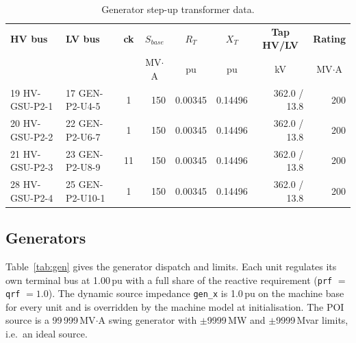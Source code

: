\begin{table}[!ht]
\centering
\small\begin{tabularx}{\linewidth}{@{}l l c r r r r r@{}}
\toprule
\textbf{HV bus} & \textbf{LV bus} & \multicolumn{1}{c}{\textbf{ck}} & \multicolumn{1}{c}{\textbf{$S_{base}$}} & \multicolumn{1}{c}{\textbf{$R_T$}} & \multicolumn{1}{c}{\textbf{$X_T$}} & \multicolumn{1}{c}{\textbf{Tap HV/LV}} & \multicolumn{1}{c}{\textbf{Rating}} \\
 & & & \multicolumn{1}{c}{MV$\cdot$A} & \multicolumn{1}{c}{pu} & \multicolumn{1}{c}{pu} & \multicolumn{1}{c}{kV} & \multicolumn{1}{c}{MV$\cdot$A} \\
\midrule
19 HV-GSU-P2-1 & 17 GEN-P2-U4-5  & 1  & 150 & 0.00345 & 0.14496 & 362.0 / 13.8 & 200 \\
20 HV-GSU-P2-2 & 22 GEN-P2-U6-7  & 1  & 150 & 0.00345 & 0.14496 & 362.0 / 13.8 & 200 \\
21 HV-GSU-P2-3 & 23 GEN-P2-U8-9  & 11 & 150 & 0.00345 & 0.14496 & 362.0 / 13.8 & 200 \\
28 HV-GSU-P2-4 & 25 GEN-P2-U10-1 & 1  & 150 & 0.00345 & 0.14496 & 362.0 / 13.8 & 200 \\
\bottomrule
\end{tabularx}
\caption{Generator step-up transformer data.}
\label{tab:xfmr}
\end{table}

\subsection{Generators}

Table~\ref{tab:gen} gives the generator dispatch and limits. Each unit regulates
its own terminal bus at 1.00\,pu with a full share of the reactive requirement
(\texttt{prf} $=$ \texttt{qrf} $= 1.0$). The dynamic source impedance
\texttt{gen\_x} is 1.0\,pu on the machine base for every unit and is overridden by
the machine model at initialisation. The POI source is a 99\,999\,MV$\cdot$A swing
generator with $\pm$9999\,MW and $\pm$9999\,Mvar limits, i.e.\ an ideal source.

